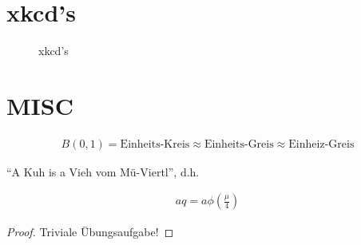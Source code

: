 \documentclass{article}
\begin{document}
\section{xkcd's}

\begin{figure}[H]
  \centering
  \hspace{0mm}
  \caption{xkcd's}
  \label{fig:xkcd}
\end{figure}

\section{MISC}

\begin{theorem}

  \begin{align*}
    B(0, 1)
    =
    \text{Einheits-Kreis}
    \approx
    \text{Einheits-Greis}
    \approx
    \text{Einheiz-Greis}
  \end{align*}

\end{theorem}

\begin{theorem}

  \enquote{A Kuh is a Vieh vom Mü-Viertl}, d.h.

  \begin{align}
    aq = a \phi \left( \frac{\mu}{4} \right)
  \end{align}

\end{theorem}

\begin{proof}
  Triviale Übungsaufgabe!
\end{proof}
\end{document}
